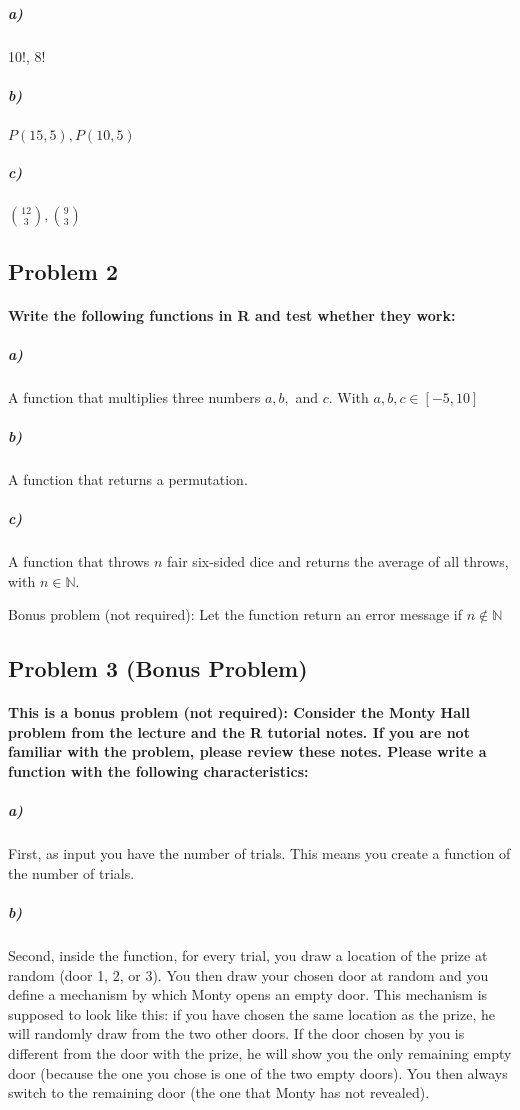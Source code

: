 \documentclass[12pt,letter]{article}
\begin{document}
\subparagraph{a)} 10!, 8!

\subparagraph{b)} $P(15,5), P(10,5)$

\subparagraph{c)} $\binom{12}{3}, \binom{9}{3}$



\subsection*{Problem 2}

\paragraph{Write the following functions in R and test whether they work:}

\subparagraph{a)} A function that multiplies three numbers $a, b,$ and $c$. With $a, b, c \in [-5,10]$

\subparagraph{b)} A function that returns a permutation.

\subparagraph{c)} A function that throws $n$ fair six-sided dice and returns the average of all throws, with $n \in \mathbb{N}$.

Bonus problem (not required): Let the function return an error message if $n \notin \mathbb{N}$ 



\subsection*{Problem 3 (Bonus Problem)}

\paragraph{This is a bonus problem (not required): Consider the Monty Hall problem from the lecture and the R tutorial notes. If you are not familiar with the problem, please review these notes. Please write a function with the following characteristics:}

\subparagraph{a)} First, as input you have the number of trials. This means you create a function of the number of trials.

\subparagraph{b)} Second, inside the function, for every trial, you draw a location of the prize at random (door 1, 2, or 3). You then draw your chosen door at random and you define a mechanism by which Monty opens an empty door. This mechanism is supposed to look like this:  if you have chosen the same location as the prize, he will randomly draw from the two other doors. If the door chosen by you is different from the door with the prize, he will show you the only remaining empty door (because the one you chose is one of the two empty doors). You then always switch to the remaining door (the one that Monty has not revealed).
\end{document}
